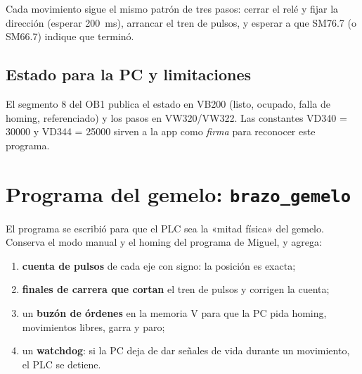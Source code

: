 \documentclass[a4paper,11pt]{article}
\begin{document}
Cada movimiento sigue el mismo patrón de tres pasos: cerrar el relé y fijar la dirección (esperar 200~ms), arrancar el tren de pulsos, y esperar a que SM76.7 (o SM66.7) indique que terminó.

\subsection{Estado para la PC y limitaciones}
El segmento 8 del OB1 publica el estado en VB200 (listo, ocupado, falla de homing, referenciado) y los pasos en VW320/VW322. Las constantes VD340 = 30000 y VD344 = 25000 sirven a la app como \emph{firma} para reconocer este programa.


\section{Programa del gemelo: \texttt{brazo\_gemelo}}\label{sec:gemelo_plc}

El programa  se escribió para que el PLC sea la «mitad física» del gemelo. Conserva el modo manual y el homing del programa de Miguel, y agrega:
\begin{enumerate}
\item \textbf{cuenta de pulsos} de cada eje con signo: la posición es exacta;
\item \textbf{finales de carrera que cortan} el tren de pulsos y corrigen la cuenta;
\item un \textbf{buzón de órdenes} en la memoria V para que la PC pida homing, movimientos libres, garra y paro;
\item un \textbf{watchdog}: si la PC deja de dar señales de vida durante un movimiento, el PLC se detiene.
\end{enumerate}
\end{document}
